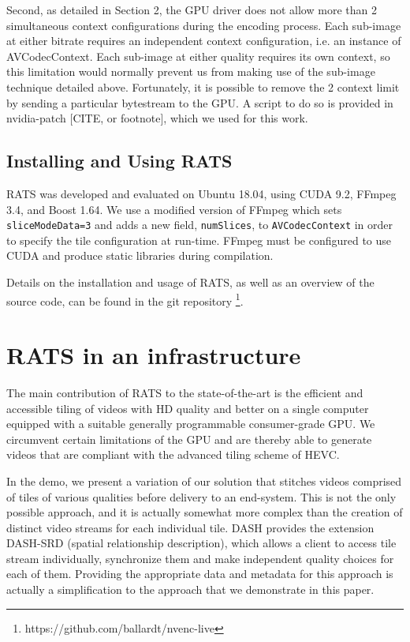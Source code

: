 Second, as detailed in Section 2, the GPU driver does not allow more than 2 simultaneous context configurations during the encoding process. Each sub-image at either bitrate requires an independent context configuration, i.e. an instance of AVCodecContext. Each sub-image at either quality requires its own context, so this limitation would normally prevent us from making use of the sub-image technique detailed above. Fortunately, it is possible to remove the 2 context limit by sending a particular bytestream to the GPU. A script to do so is provided in nvidia-patch [CITE, or footnote], which we used for this work.

\subsection{Installing and Using RATS}
RATS was developed and evaluated on Ubuntu 18.04, using CUDA 9.2, FFmpeg 3.4, and Boost 1.64. We use a modified version of FFmpeg which sets \texttt{sliceModeData=3} and adds a new field, \texttt{numSlices}, to \texttt{AVCodecContext} in order to specify the tile configuration at run-time. FFmpeg must be configured to use CUDA and produce static libraries during compilation.

Details on the installation and usage of RATS, as well as an overview of the source code, can be found in the git repository \footnote{https://github.com/ballardt/nvenc-live}. 

\section{RATS in an infrastructure}

The main contribution of RATS to the state-of-the-art is the efficient and accessible
tiling of videos with HD quality and better on a single computer equipped with a
suitable generally programmable consumer-grade GPU.
We circumvent certain limitations of the GPU and are thereby able to generate videos
that are compliant with the advanced tiling scheme of HEVC.

In the demo, we present
a variation of our solution that stitches videos comprised of tiles of various
qualities before delivery to an end-system.
This is not the only possible approach, and it is actually somewhat more complex
than the creation of distinct video streams for each individual tile.
DASH provides the extension DASH-SRD (spatial relationship description), which
allows a client to access tile stream individually, synchronize them and make
independent quality choices for each of them. Providing the appropriate data and
metadata for this approach is actually a simplification to the approach that we
demonstrate in this paper.

